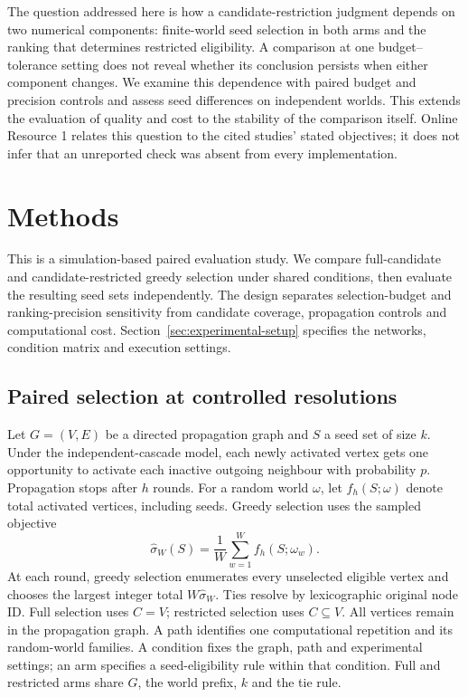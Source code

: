 \documentclass[smallextended]{svjour3}
\begin{document}
The question addressed here is how a candidate-restriction judgment depends on two numerical components: finite-world seed selection in both arms and the ranking that determines restricted eligibility. A comparison at one budget--tolerance setting does not reveal whether its conclusion persists when either component changes. We examine this dependence with paired budget and precision controls and assess seed differences on independent worlds. This extends the evaluation of quality and cost to the stability of the comparison itself. Online Resource 1 relates this question to the cited studies' stated objectives; it does not infer that an unreported check was absent from every implementation.

\section{Methods}
This is a simulation-based paired evaluation study. We compare full-candidate and candidate-restricted greedy selection under shared conditions, then evaluate the resulting seed sets independently. The design separates selection-budget and ranking-precision sensitivity from candidate coverage, propagation controls and computational cost. Section~\ref{sec:experimental-setup} specifies the networks, condition matrix and execution settings.
\subsection{Paired selection at controlled resolutions}
Let $G=(V,E)$ be a directed propagation graph and $S$ a seed set of size $k$. Under the independent-cascade model, each newly activated vertex gets one opportunity to activate each inactive outgoing neighbour with probability $p$. Propagation stops after $h$ rounds. For a random world $\omega$, let $f_h(S;\omega)$ denote total activated vertices, including seeds. Greedy selection uses the sampled objective
\begin{equation}
\widehat\sigma_W(S)=\frac{1}{W}\sum_{w=1}^{W}f_h(S;\omega_w).
\end{equation}
At each round, greedy selection enumerates every unselected eligible vertex and chooses the largest integer total $W\widehat\sigma_W$. Ties resolve by lexicographic original node ID. Full selection uses $C=V$; restricted selection uses $C\subseteq V$. All vertices remain in the propagation graph. A path identifies one computational repetition and its random-world families. A condition fixes the graph, path and experimental settings; an arm specifies a seed-eligibility rule within that condition. Full and restricted arms share $G$, the world prefix, $k$ and the tie rule.
\end{document}
